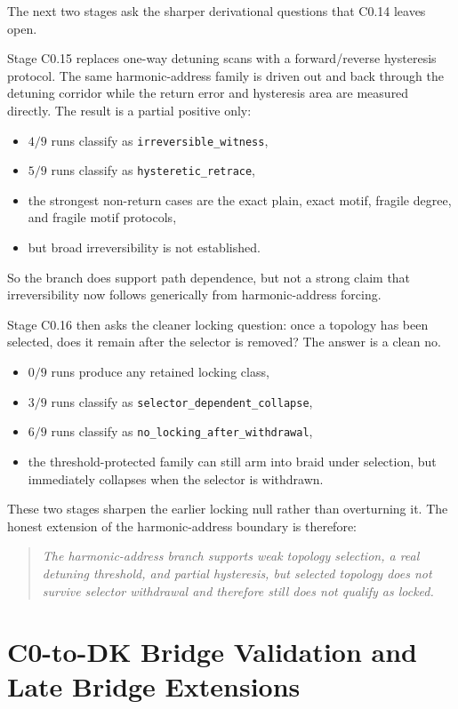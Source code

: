 \documentclass[11pt]{article}
\begin{document}
The next two stages ask the sharper derivational questions that C0.14 leaves open.

Stage C0.15 replaces one-way detuning scans with a forward/reverse hysteresis protocol. The same harmonic-address family is driven out and back through the detuning corridor while the return error and hysteresis area are measured directly. The result is a partial positive only:
\begin{itemize}
\item $4/9$ runs classify as \texttt{irreversible\_witness},
\item $5/9$ runs classify as \texttt{hysteretic\_retrace},
\item the strongest non-return cases are the exact plain, exact motif, fragile degree, and fragile motif protocols,
\item but broad irreversibility is not established.
\end{itemize}
So the branch does support path dependence, but not a strong claim that irreversibility now follows generically from harmonic-address forcing.

Stage C0.16 then asks the cleaner locking question: once a topology has been selected, does it remain after the selector is removed? The answer is a clean no.
\begin{itemize}
\item $0/9$ runs produce any retained locking class,
\item $3/9$ runs classify as \texttt{selector\_dependent\_collapse},
\item $6/9$ runs classify as \texttt{no\_locking\_after\_withdrawal},
\item the threshold-protected family can still arm into braid under selection, but immediately collapses when the selector is withdrawn.
\end{itemize}

These two stages sharpen the earlier locking null rather than overturning it. The honest extension of the harmonic-address boundary is therefore:
\begin{quote}
\emph{The harmonic-address branch supports weak topology selection, a real detuning threshold, and partial hysteresis, but selected topology does not survive selector withdrawal and therefore still does not qualify as locked.}
\end{quote}

\section{C0-to-DK Bridge Validation and Late Bridge Extensions}
\end{document}

